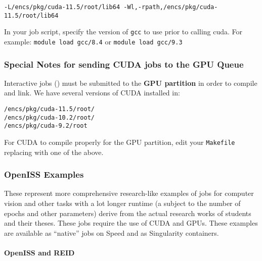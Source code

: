 \begin{verbatim}
-L/encs/pkg/cuda-11.5/root/lib64 -Wl,-rpath,/encs/pkg/cuda-11.5/root/lib64
\end{verbatim}

In your job script, specify the version of \texttt{gcc} to use prior to calling 
cuda. For example: 
   \texttt{module load gcc/8.4}
or
   \texttt{module load gcc/9.3}

\subsubsection{Special Notes for sending CUDA jobs to the GPU Queue}

Interactive 
jobs () must be submitted to the \textbf{GPU partition} in order to compile 
and link.
%
We have several versions of CUDA installed in:
\begin{verbatim}
/encs/pkg/cuda-11.5/root/
/encs/pkg/cuda-10.2/root/
/encs/pkg/cuda-9.2/root
\end{verbatim}

For CUDA to compile properly for the GPU partition, edit your \texttt{Makefile}
replacing  with one of the above.

\subsubsection{OpenISS Examples}
\label{sect:openiss-examples}

These represent more comprehensive research-like examples of
jobs for computer vision and other tasks with a lot longer
runtime (a subject to the number of epochs and other parameters)
derive from the actual research works of students and their
theses.
%
These jobs require the use of CUDA and GPUs.
These examples are available as ``native'' jobs on Speed
and as Singularity containers.

\paragraph{OpenISS and REID}
\label{sect:openiss-reid}

